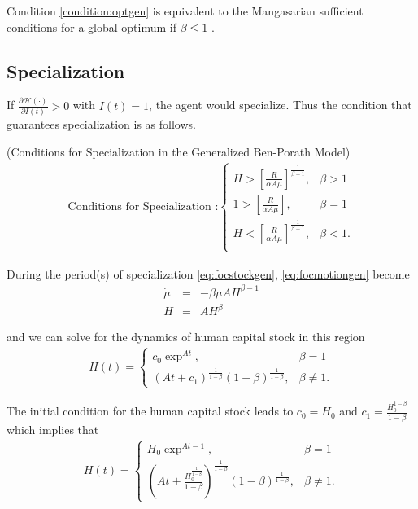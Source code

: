 \indent Condition \ref{condition:optgen} is equivalent to the Mangasarian sufficient conditions for a global optimum if $\beta \leq 1$ \citep[see][]{mangasarian1966sufficient}.

\subsection{Specialization}
If $\frac{\partial \mathcal{H} (\cdot)}{\partial I(t)} >0$ with $I(t)=1$, the agent would specialize. Thus the condition that guarantees specialization is as follows.

\begin{condition} (Conditions for Specialization in the Generalized Ben-Porath Model) \label{condition:spe}
\begin{eqnarray}
\text{Conditions for Specialization :}
\begin{cases}
H > \left[ \frac{R}{\alpha A \mu} \right]^{\frac{1}{\beta - 1}}, & \beta > 1 \\
1 > \left[ \frac{R}{\alpha A \mu} \right], & \beta = 1 \\
H < \left[ \frac{R}{\alpha A \mu} \right]^{\frac{1}{\beta - 1}}, & \beta < 1. \\
\end{cases}
\end{eqnarray}
\end{condition}

\indent During the period(s) of specialization \eqref{eq:focstockgen}, \eqref{eq:focmotiongen} become 
\begin{eqnarray}
\dot{\mu} &=& - \beta \mu A H^{\beta - 1} \label{eq:focstockgenspe} \\
\dot{H}  &=& A H^{\beta} \label{eq:focmotiongenspe}
\end{eqnarray}

\noindent and we can solve for the dynamics of human capital stock in this region
\begin{eqnarray}
H(t) =
\begin{cases}
c_{0} \exp^{At}, & \beta = 1 \\ 
\left( At + c_{1} \right)^{\frac{1}{1 - \beta}} (1 - \beta)^{\frac{1}{1 - \beta}}, & \beta \neq 1.

\end{cases}
\end{eqnarray}

\noindent The initial condition for the human capital stock leads to $c_{0} = H_{0} $ and $c_{1} = \frac{H_{0}^{1 - \beta}}{1-\beta}$ which implies that
\begin{eqnarray}
H(t) =
\begin{cases}
H_{0} \exp^{At - 1}, & \beta = 1 \\
\left( At + \frac{H_{0}^{\frac{1}{1-\beta}}}{1-\beta} \right)^{\frac{1}{1 - \beta}} \left( 1 - \beta \right)^{\frac{1}{1-\beta}}, & \beta \neq 1. \label{eq:humanspe}
\end{cases}
\end{eqnarray}

